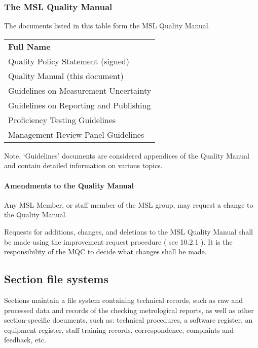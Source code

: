 \subsubsection{The MSL Quality Manual}
The documents listed in this table form the MSL Quality Manual. 
{\renewcommand*{\arraystretch}{1.4}
\begin{longtable}{p{25em}}
	\rowcolor[rgb]{ 0,  0,  0} 
	\textcolor[rgb]{ 1,  1,  1}{\textbf{Full Name}} \\
	
Quality Policy Statement (signed) \\

Quality Manual (this document) \\

Guidelines on Measurement Uncertainty \\

Guidelines on Reporting and Publishing \\

Proficiency Testing Guidelines \\

Management Review Panel Guidelines \\
\bottomrule
\end{longtable}
}%

Note, `Guidelines' documents are considered appendices of the Quality Manual and contain detailed information on various topics. 

\paragraph{Amendments to the Quality Manual}
Any MSL Member, or staff member of the MSL group, may request a change to the Quality Manual. 

Requests for additions, changes, and deletions to the MSL Quality Manual shall be made using the improvement request procedure ( see 10.2.1 ).
It is the responsibility of the MQC to decide what changes shall be made.

\subsection{Section file systems}
\label{ss:section_file_systems}
Sections maintain a file system containing technical records, such as raw and processed data and records of the checking metrological reports, as well as other section-specific documents, such as: technical procedures, a software register, an equipment register, staff training records, correspondence, complaints and feedback, etc. 

